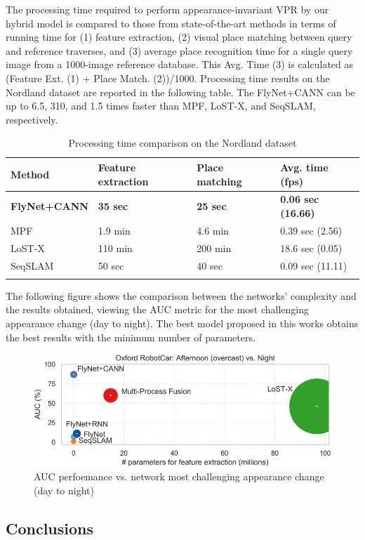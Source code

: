 The processing time required to perform appearance-invariant VPR by our
hybrid model is compared to those from state-of-the-art methods in terms
of running time for (1) feature extraction, (2) visual place matching
between query and reference traverses, and (3) average place recognition
time for a single query image from a 1000-image reference database. This
Avg. Time (3) is calculated as (Feature Ext. (1) + Place Match.
(2))/1000. Processing time results on the Nordland dataset are reported
in the following table. The FlyNet+CANN can be up to 6.5, 310, and 1.5
times faster than MPF, LoST-X, and SeqSLAM, respectively.

\begin{longtable}[]{@{}llll@{}}
\toprule
\textbf{Method} & \textbf{Feature extraction} & \textbf{Place matching}
& \textbf{Avg. time (fps)}\tabularnewline
\midrule
\endhead
\textbf{FlyNet+CANN} & \textbf{35 sec} & \textbf{25 sec} & \textbf{0.06
sec (16.66)}\tabularnewline
MPF & 1.9 min & 4.6 min & 0.39 sec (2.56)\tabularnewline
LoST-X & 110 min & 200 min & 18.6 sec (0.05)\tabularnewline
SeqSLAM & 50 sec & 40 sec & 0.09 sec (11.11)\tabularnewline
\bottomrule
\caption{Processing time comparison on the Nordland dataset}
\end{longtable}

The following figure shows the comparison between the networks'
complexity and the results obtained, viewing the AUC metric for the most
challenging appearance change (day to night). The best model proposed in
this works obtains the best results with the minimum number of
parameters.

\begin{figure}[h!]
\centering
\includegraphics[width=1\linewidth]{images/flynetothermodeldimensions.png}
\caption{AUC perfoemance vs. network most challenging appearance change (day to night)}
\end{figure}

\subsection{Conclusions}\label{header-n256}

